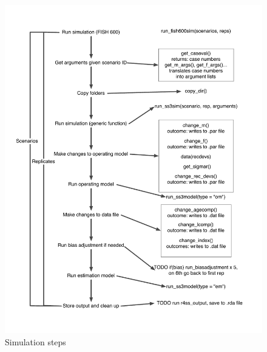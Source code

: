 \documentclass[12pt]{article}
\begin{document}
\begin{figure}[htbp]
  \centering
    \includegraphics[width=5.5in]{sim-steps.pdf}
  \caption{Simulation steps}
  \label{fig:sim-steps}
\end{figure}








%
\end{document}

